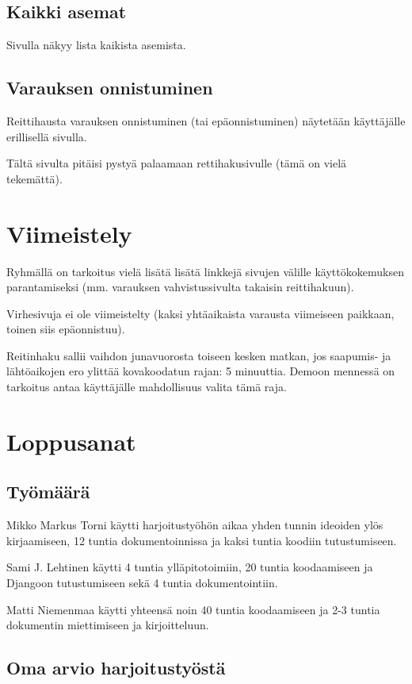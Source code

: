 \documentclass[a4paper,twoside,titlepage,12pt]{article}
\begin{document}
\subsection{Kaikki asemat}
Sivulla näkyy lista kaikista asemista.

\subsection{Varauksen onnistuminen}

Reittihausta varauksen onnistuminen (tai epäonnistuminen) näytetään
käyttäjälle erillisellä sivulla.

Tältä sivulta pitäisi pystyä palaamaan rettihakusivulle (tämä on vielä
tekemättä).

\section{Viimeistely}

Ryhmällä on tarkoitus vielä lisätä lisätä linkkejä sivujen välille
käyttökokemuksen parantamiseksi (mm. varauksen vahvistussivulta takaisin
reittihakuun).

Virhesivuja ei ole viimeistelty (kaksi yhtäaikaista varausta viimeiseen
paikkaan, toinen siis epäonnistuu).

Reitinhaku sallii vaihdon junavuorosta toiseen kesken matkan, jos saapumis- ja
lähtöaikojen ero ylittää kovakoodatun rajan: 5 minuuttia. Demoon mennessä on
tarkoitus antaa käyttäjälle mahdollisuus valita tämä raja.

\section{Loppusanat}
\subsection{Työmäärä}

Mikko Markus Torni käytti harjoitustyöhön aikaa yhden tunnin ideoiden ylös kirjaamiseen, 12 tuntia dokumentoinnissa ja kaksi tuntia koodiin tutustumiseen.

Sami J. Lehtinen käytti 4 tuntia ylläpitotoimiin, 20 tuntia koodaamiseen
ja Djangoon tutustumiseen sekä 4 tuntia dokumentointiin.

Matti Niemenmaa käytti yhteensä noin 40 tuntia koodaamiseen ja 2-3 tuntia
dokumentin miettimiseen ja kirjoitteluun.

\subsection{Oma arvio harjoitustyöstä}
\end{document}
